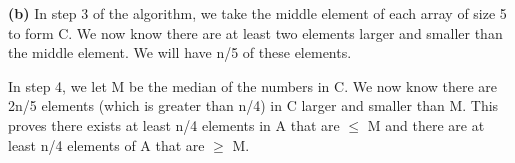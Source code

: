 \documentclass[11pt]{article}
\renewcommand\part[1]{\vspace{.10in}\textbf{(#1)}}
\begin{document}

\part{b} In step 3 of the algorithm, we take the middle element of each array of size 5 to form C. We now know there are at least two elements larger and smaller than the middle element. We will have n/5 of these elements.

	In step 4, we let M be the median of the numbers in C. We now know there are 2n/5 elements (which is greater than n/4)
	 in C larger and smaller than M. This proves there exists at least n/4 elements in A that are $\leq$ M and there are at least n/4 elements of A that are $\geq$ M.
\end{document}
